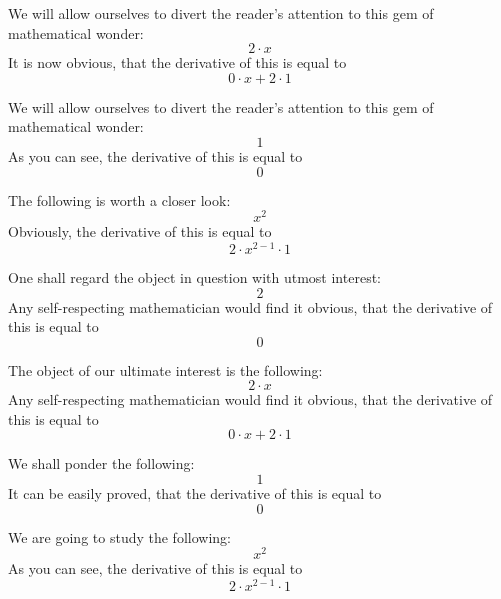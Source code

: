 \documentclass{article}
\begin{document}
We will allow ourselves to divert the reader's attention to this gem of mathematical wonder:
\begin{equation}
2 \cdot x 
\end{equation}
It is now obvious, that the derivative of this is equal to
\begin{equation}
0 \cdot x + 2 \cdot 1 
\end{equation}

We will allow ourselves to divert the reader's attention to this gem of mathematical wonder:
\begin{equation}
1 
\end{equation}
As you can see, the derivative of this is equal to
\begin{equation}
0 
\end{equation}

The following is worth a closer look:
\begin{equation}
x ^{2 } 
\end{equation}
Obviously, the derivative of this is equal to
\begin{equation}
2 \cdot x ^{2 - 1 } \cdot 1 
\end{equation}

One shall regard the object in question with utmost interest:
\begin{equation}
2 
\end{equation}
Any self-respecting mathematician would find it obvious, that the derivative of this is equal to
\begin{equation}
0 
\end{equation}

The object of our ultimate interest is the following:
\begin{equation}
2 \cdot x 
\end{equation}
Any self-respecting mathematician would find it obvious, that the derivative of this is equal to
\begin{equation}
0 \cdot x + 2 \cdot 1 
\end{equation}

We shall ponder the following:
\begin{equation}
1 
\end{equation}
It can be easily proved, that the derivative of this is equal to
\begin{equation}
0 
\end{equation}

We are going to study the following:
\begin{equation}
x ^{2 } 
\end{equation}
As you can see, the derivative of this is equal to
\begin{equation}
2 \cdot x ^{2 - 1 } \cdot 1 
\end{equation}
\end{document}
